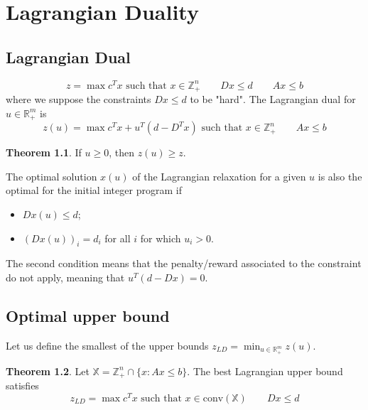 \documentclass[11pt, openany]{report}
\newcommand{\R}{\mathbb{R}}
\theoremstyle{definition}
\newtheorem{thm}{Theorem}[chapter]
\begin{document}
\chapter{Lagrangian Duality}
\section{Lagrangian Dual}
\begin{equation}
    z = \max c^Tx \text{ such that } x\in \mathbb{Z}_+^n \qquad Dx\le d\qquad Ax\le b
\end{equation}
where we suppose the constraints $Dx\le d$ to be "hard". The Lagrangian dual for $u\in \R^m_+$ is 
\begin{equation}
    z(u) = \max c^Tx + u^T(d-D^Tx) \text{ such that } x\in \mathbb{Z}_+^n \qquad Ax\le b
\end{equation}
\begin{thm}
    If $u\ge0$, then $z(u) \ge z$. 
\end{thm}
The optimal solution $x(u)$ of the Lagrangian relaxation for a given $u$ is also the optimal for the initial integer program if 
\begin{itemize}
    \item $Dx(u)\le d$;
    \item $(Dx(u))_i = d_i$ for all $i$ for which $u_i >0$.
\end{itemize}
The second condition means that the penalty/reward associated to the constraint do not apply, meaning that $u^T(d-Dx) = 0$. 
\section{Optimal upper bound}
Let us define the smallest of the upper bounds $z_{LD} = \min_{u\in \R_+^m} z(u)$. 
\begin{thm}
    Let $\mathbb{X}=\mathbb{Z}_+^n\cap \{x:Ax\le b\}$. The best Lagrangian upper bound satisfies 
    \begin{equation}
        z_{LD} = \max c^Tx \text{ such that } x\in \text{conv}(\mathbb{X}) \qquad Dx\le d
    \end{equation}
\end{thm}
\end{document}
